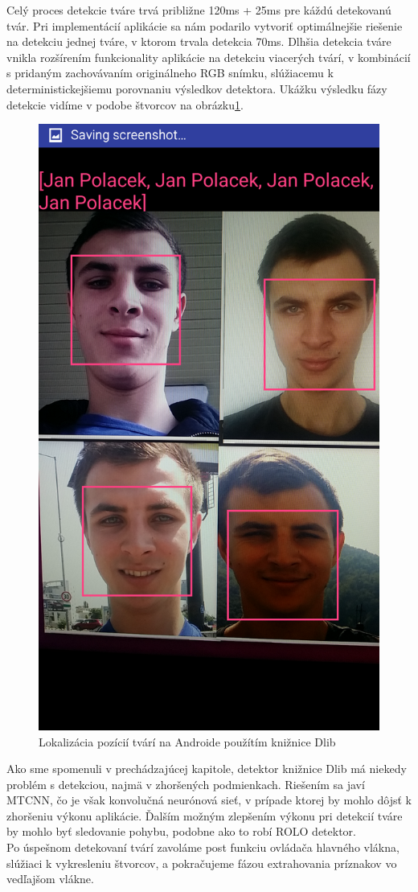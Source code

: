 \indent Celý proces detekcie tváre trvá približne 120ms + 25ms pre káždú detekovanú tvár. 
Pri implementácií aplikácie sa nám podarilo vytvoriť optimálnejšie riešenie na detekciu jednej tváre, v ktorom trvala detekcia 70ms.
Dlhšia detekcia tváre vnikla rozšírením funkcionality aplikácie na detekciu viacerých tvárí, v kombinácií s pridaným zachovávaním originálneho RGB snímku, slúžiacemu k deterministickejšiemu porovnaniu výsledkov detektora.
Ukážku výsledku fázy detekcie vidíme v podobe štvorcov na obrázku\ref{fig:android_dlib}.
\begin{figure}[H]
	\centering
	\includegraphics[width=.5\linewidth]{img/android_dlib}
	\caption{Lokalizácia pozícií tvárí na Androide použítím knižnice Dlib}
	\label{fig:android_dlib}
\end{figure}

\indent Ako sme spomenuli v prechádzajúcej kapitole, detektor knižnice Dlib má niekedy problém s detekciou, najmä v zhoršených podmienkach.
Riešením sa javí MTCNN, čo je však konvolučná neurónová sieť, v prípade ktorej by mohlo dôjsť k zhoršeniu výkonu aplikácie.
Ďalším možným zlepšením výkonu pri detekcií tváre by mohlo byť sledovanie pohybu, podobne ako to robí ROLO detektor\cite{redmon2016you}. \\

\indent Po úspešnom detekovaní tvárí zavoláme post funkciu ovládača hlavného vlákna, slúžiaci k vykresleniu štvorcov, a pokračujeme fázou extrahovania príznakov vo vedľajšom vlákne.

